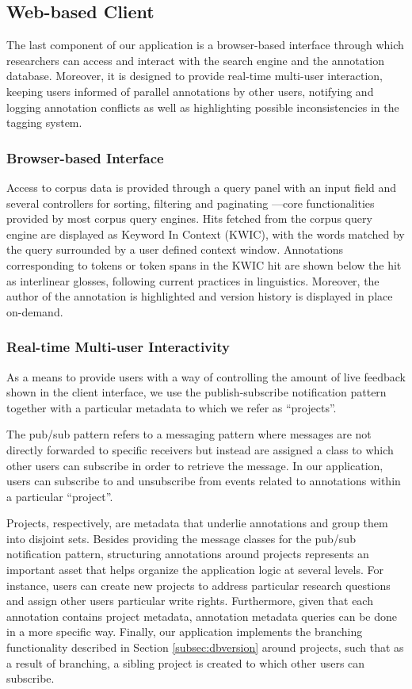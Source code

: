 \documentclass{sig-alternate}
\begin{document}
\subsection{Web-based Client}\label{subsec:client}

The last component of our application is a browser-based interface through which researchers
can access and interact with the search engine and the annotation database.
Moreover, it is designed to provide real-time multi-user interaction, keeping users informed of
parallel annotations by other users, notifying and logging annotation conflicts as well as
highlighting possible inconsistencies in the tagging system.

\subsubsection{Browser-based Interface}
Access to corpus data is provided through a query panel with an input field and several
controllers for sorting, filtering and paginating ---core functionalities provided by
most corpus query engines. Hits fetched from the corpus query engine are displayed as Keyword
In Context (KWIC), with the words matched by the query surrounded by a user defined context window.
Annotations corresponding to tokens or token spans in the KWIC hit are shown below the hit as
interlinear glosses, following current practices in linguistics. 
Moreover, the author of the annotation is highlighted and version history is displayed in place
on-demand.

\subsubsection{Real-time Multi-user Interactivity}
As a means to provide users with a way of controlling the amount of live feedback shown in the
client interface, we use the publish-subscribe notification pattern together with a particular
metadata to which we refer as ``projects''.

The pub/sub pattern refers to a messaging pattern where messages are not directly forwarded to
specific receivers but instead are assigned a class to which other users can subscribe in order to
retrieve the message. In our application, users can subscribe to and unsubscribe from events related
to annotations within a particular ``project''.

Projects, respectively, are metadata that underlie annotations and group them into disjoint sets.
Besides providing the message classes for the pub/sub notification pattern, structuring annotations
around projects represents an important asset that helps organize the application logic at
several levels. For instance, users can create new projects to address particular research questions
and assign other users particular write rights. Furthermore, given that each annotation contains
project metadata, annotation metadata queries can be done in a more specific way.
Finally, our application implements the branching functionality described in Section
\ref{subsec:dbversion} around projects, such that as a result of branching, a sibling project is
created to which other users can subscribe.
\end{document}
